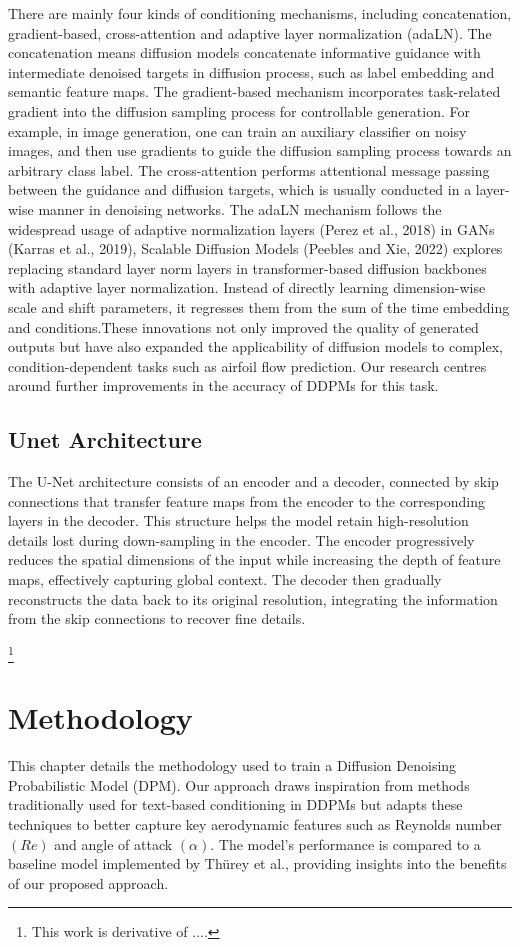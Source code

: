 \documentclass{CUP-JNL-DTM}%
\theoremstyle{definition}
\numberwithin{equation}{section}
\begin{document}
There are mainly four kinds of conditioning mechanisms, including concatenation, gradient-based, cross-attention and adaptive layer normalization (adaLN). The concatenation means diffusion models concatenate informative guidance with intermediate denoised targets in diffusion process, such as label embedding and semantic feature maps. The gradient-based mechanism incorporates task-related gradient into the diffusion sampling process for controllable generation. For example, in image generation, one can train an auxiliary classifier on noisy images, and then use gradients to guide the diffusion sampling process towards an arbitrary class label. The cross-attention performs attentional message passing between the guidance and diffusion targets, which is usually conducted in a layer-wise manner in denoising networks. The adaLN mechanism follows the widespread usage of adaptive normalization layers (Perez et al., 2018) in GANs (Karras et al., 2019), Scalable Diffusion Models (Peebles and Xie, 2022) explores replacing standard layer norm layers in transformer-based diffusion backbones with adaptive layer normalization. Instead of directly learning dimension-wise scale and shift parameters, it regresses them from the sum of the time embedding and conditions.These innovations not only improved the quality of generated outputs but have also expanded the applicability of diffusion models to complex, condition-dependent tasks such as airfoil flow prediction. Our research centres around further improvements in the accuracy of DDPMs for this task. 

\subsection{Unet Architecture}

The U-Net architecture consists of an encoder and a decoder, connected by skip connections that transfer feature maps from the encoder to the corresponding layers in the decoder. This structure helps the model retain high-resolution details lost during down-sampling in the encoder. The encoder progressively reduces the spatial dimensions of the input while increasing the depth of feature maps, effectively capturing global context. The decoder then gradually reconstructs the data back to its original resolution, integrating the information from the skip connections to recover fine details.


\footnote{This work is derivative of ....}

\section{Methodology}
This chapter details the methodology used to train a Diffusion Denoising Probabilistic Model (DPM). Our approach draws inspiration from methods traditionally used for text-based conditioning in DDPMs but adapts these techniques to better capture key aerodynamic features such as Reynolds number $(Re)$ and angle of attack $(\alpha)$. The model’s performance is compared to a baseline model implemented by Thürey et al., providing insights into the benefits of our proposed approach.
\end{document}
